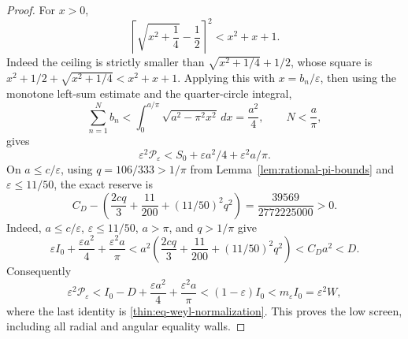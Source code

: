 \documentclass[11pt]{article}
\numberwithin{equation}{section}
\theoremstyle{definition}
\theoremstyle{remark}
\begin{document}
\begin{proof}
For \(x>0\),
\[
\left\lceil\sqrt{x^2+\frac14}-\frac12\right\rceil^2
 <x^2+x+1.
\]
Indeed the ceiling is strictly smaller than
\(\sqrt{x^2+1/4}+1/2\), whose square is
\(x^2+1/2+\sqrt{x^2+1/4}<x^2+x+1\).  Applying this with
\(x=b_n/\varepsilon\), then using the monotone left-sum estimate and the
quarter-circle integral,
\[
 \sum_{n=1}^N b_n
 <\int_0^{a/\pi}\sqrt{a^2-\pi^2x^2}\,dx=\frac{a^2}{4},
 \qquad N<\frac a\pi,
\]
gives
\[
 \varepsilon^2\mathcal P_\varepsilon
 <S_0+\varepsilon a^2/4+\varepsilon^2a/\pi.
\]
On \(a\leq c/\varepsilon\), using
\(q=106/333>1/\pi\) from Lemma~\ref{lem:rational-pi-bounds} and
\(\varepsilon\leq11/50\), the exact reserve is
\begin{equation}
 C_D-\left(\frac{2cq}{3}+\frac{11}{200}
 +(11/50)^2q^2\right)
 =\frac{39569}{2772225000}>0.
 \label{opt:eq-low-reserve}
\end{equation}
Indeed, \(a\leq c/\varepsilon\), \(\varepsilon\leq11/50\),
\(a>\pi\), and \(q>1/\pi\) give
\[
 \varepsilon I_0+\frac{\varepsilon a^2}{4}
 +\frac{\varepsilon^2a}{\pi}
 <a^2\left(\frac{2cq}{3}+\frac{11}{200}
 +(11/50)^2q^2\right)<C_Da^2<D.
\]
Consequently
\[
 \varepsilon^2\mathcal P_\varepsilon
 <I_0-D+\frac{\varepsilon a^2}{4}
 +\frac{\varepsilon^2a}{\pi}
 <(1-\varepsilon)I_0<m_\varepsilon I_0
 =\varepsilon^2W,
\]
where the last identity is \eqref{thin:eq-weyl-normalization}.
This proves the low screen, including all radial and angular equality walls.


\end{proof}
\end{document}
